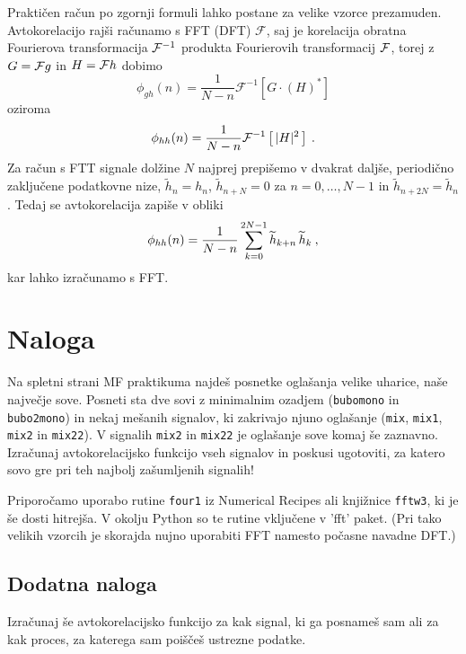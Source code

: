 \documentclass[a4paper, 12pt, slovene]{article}
\begin{document}
Praktičen račun po zgornji formuli lahko postane za velike
vzorce prezamuden.  Avtokorelacijo rajši računamo s FFT (DFT) $\mathcal{F}$,
saj je korelacija obratna Fourierova transformacija ${\cal F}^{-1}$
produkta Fourierovih transformacij ${\cal F}$, torej z $G={\cal F}g$ in $H={\cal F}h$ dobimo
\begin{equation*}
\phi_{gh}(n) = \frac{1}{N-n}\mathcal{F}^{-1} \left[ G \cdot (H)^\ast \right]
\end{equation*}
oziroma
\begin{equation*}
  \phi_{hh}(n) = \frac{1}{N-n}{\cal F}^{-1} \left[ \, | H |^2 \, \right] \>.
\end{equation*}
Za račun s FTT signale dolžine $N$ najprej prepišemo v dvakrat
daljše, periodično zaključene podatkovne nize, $\widetilde{h}_n = h_n$,
$\widetilde{h}_{n+N} = 0$ za $n = 0, \ldots, N-1$
in $\widetilde{h}_{n+2N} = \widetilde{h}_{n}$.
Tedaj se avtokorelacija zapiše v obliki
\begin{equation*}
\phi_{hh}(n)={1\over N-n}\sum_{k=0}^{2N-1}\widetilde{h}_{k+n}\,\widetilde{h}_k \>,  
\end{equation*}
kar lahko izračunamo s FFT.

\section{Naloga}

Na spletni strani MF praktikuma najdeš posnetke
oglašanja velike uharice, naše največje sove.  Posneti sta
dve sovi z minimalnim ozadjem ({\tt bubomono} in {\tt bubo2mono})
in nekaj mešanih signalov, ki zakrivajo njuno oglašanje
({\tt mix}, {\tt mix1}, {\tt mix2} in {\tt mix22}).
V signalih {\tt mix2} in {\tt mix22} je oglašanje sove
komaj še zaznavno.  Izračunaj avtokorelacijsko funkcijo 
vseh signalov in poskusi ugotoviti, za katero sovo gre
pri teh najbolj zašumljenih signalih!

Priporočamo uporabo rutine {\tt four1\/} iz Numerical Recipes
ali knjižnice {\tt fftw3}, ki je še dosti hitrejša. V okolju Python
so te rutine vključene v 'fft' paket. 
(Pri tako velikih vzorcih je skorajda nujno uporabiti FFT
namesto počasne navadne DFT.)

\bigskip

\subsection{Dodatna naloga}
Izračunaj še avtokorelacijsko funkcijo za kak signal, ki ga posnameš sam ali za kak proces, za katerega sam poiščeš ustrezne podatke.
\end{document}
